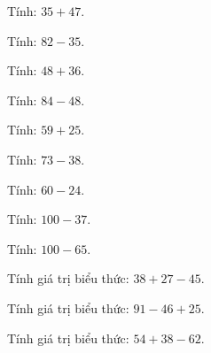 \begin{ex}
Tính: $35 + 47$.
\end{ex}

\begin{ex}
Tính: $82 - 35$.
\end{ex}

\begin{ex}
Tính: $48 + 36$.
\end{ex}

\begin{ex}
Tính: $84 - 48$.
\end{ex}

\begin{ex}
Tính: $59 + 25$.
\end{ex}

\begin{ex}
Tính: $73 - 38$.
\end{ex}

\begin{ex}
Tính: $60 - 24$.
\end{ex}

\begin{ex}
Tính: $100 - 37$.
\end{ex}

\begin{ex}
Tính: $100 - 65$.
\end{ex}

\begin{ex}
Tính giá trị biểu thức: $38 + 27 - 45$.
\end{ex}

\begin{ex}
Tính giá trị biểu thức: $91 - 46 + 25$.
\end{ex}

\begin{ex}
Tính giá trị biểu thức: $54 + 38 - 62$.
\end{ex}

